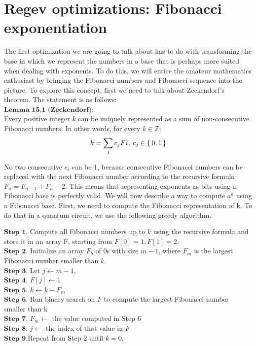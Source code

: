 \chapter{Regev optimizations: Fibonacci exponentiation}

The first optimization we are going to talk about has to do with transforming the base in which we represent the numbers in a base that is perhaps more suited when dealing with exponents. To do this, we will entice the amateur mathematics enthusiast by bringing the Fibonacci numbers and Fibonacci sequence into the picture.
To explore this concept, first we need to talk about Zeckendorf's theorem. The statement is as follows:\\

$\textbf{Lemma 15.1 (Zeckendorf)}:$\\
Every positive integer $k$ can be uniquely represented as a sum of non-consecutive Fibonacci numbers. In other words, for every $k \in \mathbb{Z}$:
\begin{equation}
    k = \sum_j c_jFi, \: c_j \in \set{0,1}
\end{equation}

No two consecutive $c_i$ can be 1, because consecutive Fibonacci numbers can be replaced with the next Fibonacci number according to the recursive formula $F_n = F_{n-1} + {F_n-2}$. This means that representing exponents as bits using a Fibonacci base is perfectly valid. We will now describe a way to compute $a^{k}$ using a Fibonacci base. First, we need to compute the Fibonacci representation of k. To do that in a quantum circuit, we use the following greedy algorithm.

$\textbf{Step 1.}$ Compute all Fibonacci numbers up to $k$ using the recursive formula and store it in an array F, starting from $F[0] = 1,F[1] = 2$.\\
$\textbf{Step 2.}$ Initialize an array $F_b$ of 0s with size $m-1$, where $F_m$ is the largest Fibonacci number smaller than $k$\\
$\textbf{Step 3.}$ Let $j \gets m - 1$.\\
$\textbf{Step 4.}$ $F[j] \gets 1$\\
$\textbf{Step 5.}$ $k \gets k - F_m$\\
$\textbf{Step 6.}$ Run binary search on $F$ to compute the largest Fibonacci number smaller than k\\
$\textbf{Step 7.}$ $F_m \gets$ the value computed in Step 6\\
$\textbf{Step 8.}$ $j \gets$ the index of that value in $F$ \\
$\textbf{Step 9.}$Repeat from Step 2 until $k = 0$.\\


